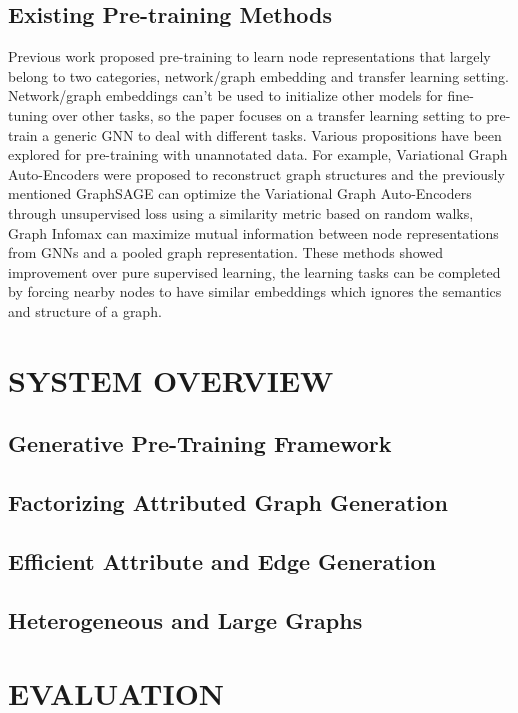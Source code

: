 \documentclass[sigconf,natbib=false]{acmart}
\begin{document}
	\subsection{Existing Pre-training Methods}
Previous work proposed pre-training to learn node representations that largely belong to two categories, network/graph embedding and transfer learning setting. Network/graph embeddings can't be used to initialize other models for fine-tuning over other tasks, so the paper focuses on a transfer learning setting to pre-train a generic GNN to deal with different tasks. Various propositions have been explored for pre-training with unannotated data. For example, Variational Graph Auto-Encoders were proposed to reconstruct graph structures and the previously mentioned GraphSAGE can optimize the Variational Graph Auto-Encoders through unsupervised loss using a similarity metric based on random walks, Graph Infomax can maximize mutual information between node representations from GNNs and a pooled graph representation. These methods showed improvement over pure supervised learning, the learning tasks can be completed by forcing nearby nodes to have similar embeddings which ignores the semantics and structure of a graph.

	\section{SYSTEM OVERVIEW}
	\subsection{Generative Pre-Training Framework}

	\subsection{Factorizing Attributed Graph Generation}

	\subsection{Efficient Attribute and Edge Generation}

	\subsection{Heterogeneous and Large Graphs}


	\section{EVALUATION}
\end{document}
